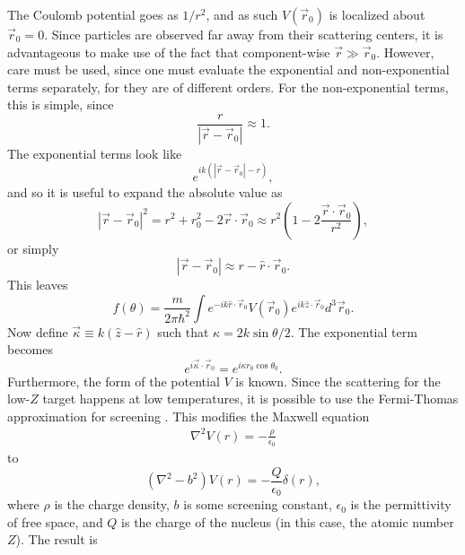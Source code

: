 The Coulomb potential goes as $1/r^2$, and as such $V(\vec{r}_0)$ is localized about $\vec{r}_0=0$. Since particles are observed far away from their scattering centers, it is advantageous to make use of the fact that component-wise $\vec{r} \gg \vec{r}_0$. However, care must be used, since one must evaluate the exponential and non-exponential terms separately, for they are of different orders. For the non-exponential terms, this is simple, since
%
\begin{equation}\nonumber
\frac{r}{|\vec{r}-\vec{r}_0|}\approx1.
\end{equation}
%
The exponential terms look like
%
\begin{equation}\nonumber
e^{ik(|\vec{r}-\vec{r}_0|-r)},
\end{equation}
and so it is useful to expand the absolute value as
\begin{equation}\nonumber
|\vec{r}-\vec{r}_0|^2=r^2+r_0^2-2\vec{r}\cdot\vec{r}_0\approx r^2\left(1-2\frac{\vec{r}\cdot\vec{r}_0}{r^2}\right),
\end{equation}
%
or simply
%
\begin{equation} \nonumber |\vec{r}-\vec{r}_0|\approx r-\hat{r}\cdot\vec{r}_0. \end{equation}
%
This leaves
%
\begin{equation} \label{eqn:generalscattering}
f(\theta)=\frac{m}{2\pi\hbar^2}\int
e^{-ik\hat{r}\cdot\vec{r}_0}
V(\vec{r}_0)
e^{ik\hat{z}\cdot\vec{r}_0}
d^3\vec{r}_0.
\end{equation}
%
Now define $\vec{\kappa}\equiv k(\hat{z}-\hat{r})$ such that $\kappa=2k\sin{\theta/2}$. The exponential term becomes
%
\begin{equation} \nonumber
e^{i\vec{\kappa}\cdot\vec{r}_0}=e^{i\kappa r_0\cos{\theta_0}}.
\end{equation}
Furthermore, the form of the potential $V$ is known. Since the scattering for the low-$Z$ target happens at low temperatures, it is possible to use the Fermi-Thomas approximation for screening \cite{ashcroft}. This modifies the Maxwell equation 
\begin{align*}
\nabla^2 V(r) = -\frac{\rho}{\epsilon_0}
\end{align*}
to
\begin{equation} \nonumber
(\nabla^2-b^2)V(r)=-\frac{Q}{\epsilon_0}\delta(r),
\end{equation}
%
where $\rho$ is the charge density, $b$ is some screening constant, $\epsilon_0$ is the permittivity of free space, and $Q$ is the charge of the nucleus (in this case, the atomic number $Z$). The result is
